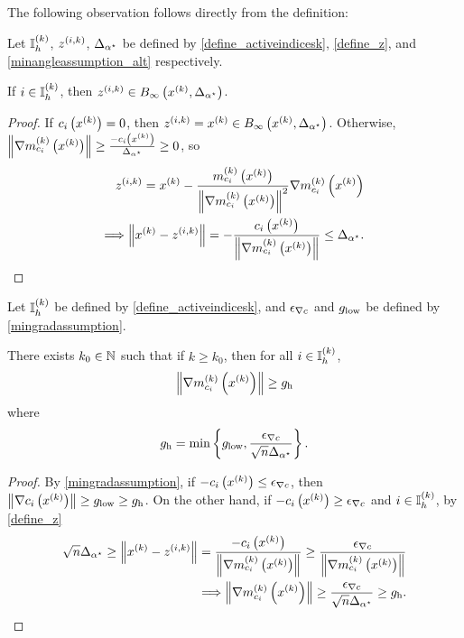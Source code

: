 The following observation follows directly from the definition:
\begin{lemma}
\label{doesntreallyneedtobesaid}
Let ${ \mathbb I_h^{(k)} }$, ${z^{(i, k)}}$, ${\Delta_{\alpha^{\star}}}$ be defined by \cref{define_activeindicesk}, \cref{define_z}, and \cref{minangleassumption_alt} respectively.

If $i \in { \mathbb I_h^{(k)} }$, then ${z^{(i, k)}} \in B_{\infty}\left(x^{(k)}, {\Delta_{\alpha^{\star}}} \right)$.
\end{lemma}
\begin{proof}
If $c_i\left(x^{(k)}\right) = 0$, then ${z^{(i, k)}} = x^{(k)} \in B_{\infty}\left(x^{(k)}, {\Delta_{\alpha^{\star}}} \right)$.
Otherwise, $\left\|{\nabla m_{c_i}^{(k)}\left(x^{(k)}\right)}\right\| \ge \frac{-c_i\left(x^{(k)}\right)}{{\Delta_{\alpha^{\star}}}} \ge 0$, so
\begin{align*}
{z^{(i, k)}} = x^{(k)} - \frac{m^{(k)}_{c_i}\left(x^{(k)}\right)}{\left\|{\nabla m_{c_i}^{(k)}\left(x^{(k)}\right)}\right\|^2} {\nabla m_{c_i}^{(k)}\left(x^{(k)}\right)} \\
\Longrightarrow \left\|x^{(k)} - {z^{(i, k)}} \right\|= -\frac{c_i\left(x^{(k)}\right)}{\left\|{\nabla m_{c_i}^{(k)}\left(x^{(k)}\right)}\right\|} \le {\Delta_{\alpha^{\star}}}.
\end{align*}
\end{proof}

\begin{lemma}
\label{underbound}
Let ${ \mathbb I_h^{(k)} }$ be defined by \cref{define_activeindicesk}, and ${\epsilon_{\nabla c}}$ and ${ g_{\textrm{low}} }$ be defined by \cref{mingradassumption}.



There exists $k_0 \in \mathbb N$ such that if $k \ge k_0$, then
for all $i \in { \mathbb I_h^{(k)} }$,
\begin{align*}
\left\|{\nabla m_{c_i}^{(k)}\left(x^{(k)}\right)}\right\| \ge { g_{\textrm{h}} }
\end{align*}
where
\begin{align}
\label{define_activegradmin}
{ g_{\textrm{h}} } = \min\left\{{ g_{\textrm{low}} }, \frac{{\epsilon_{\nabla c}}}{\sqrt{n} {\Delta_{\alpha^{\star}}}}\right\}.
\end{align}
\end{lemma}
\begin{proof}

By \cref{mingradassumption}, if $-c_i\left(x^{(k)}\right) \le {\epsilon_{\nabla c}}$, then $\left\|\nabla c_i\left(x^{(k)}\right)\right\| \ge { g_{\textrm{low}} } \ge { g_{\textrm{h}} }$.
On the other hand, if $-c_i\left(x^{(k)}\right) \ge {\epsilon_{\nabla c}}$ and $i \in { \mathbb I_h^{(k)} }$, by \cref{define_z}
\begin{align*}
\sqrt{n} {\Delta_{\alpha^{\star}}} \ge \left\|x^{(k)} - {z^{(i, k)}} \right\|
= \frac{-c_i\left(x^{(k)}\right)}{\left\|{\nabla m_{c_i}^{(k)}\left(x^{(k)}\right)}\right\|}
\ge \frac{{\epsilon_{\nabla c}}}{\left\|{\nabla m_{c_i}^{(k)}\left(x^{(k)}\right)}\right\|} \\
\Longrightarrow
\left\|{\nabla m_{c_i}^{(k)}\left(x^{(k)}\right)}\right\| \ge \frac{{\epsilon_{\nabla c}}}{\sqrt{n} {\Delta_{\alpha^{\star}}}} \ge { g_{\textrm{h}} }.
\end{align*}
\end{proof}


